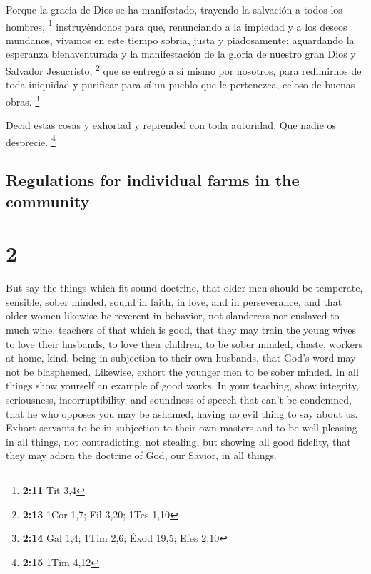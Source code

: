 \begin{paracol}{2}
 Porque la gracia de Dios se ha manifestado, trayendo la
salvación a todos los hombres, \footnote{\textbf{2:11} Tit 3,4}
 instruyéndonos para que, renunciando a la impiedad y a
los deseos mundanos, vivamos en este tiempo sobria, justa y
piadosamente;  aguardando la esperanza bienaventurada y
la manifestación de la gloria de nuestro gran Dios y Salvador
Jesucristo, \footnote{\textbf{2:13} 1Cor 1,7; Fil 3,20; 1Tes 1,10}
 que se entregó a sí mismo por nosotros, para redimirnos
de toda iniquidad y purificar para sí un pueblo que le pertenezca,
celoso de buenas obras. \footnote{\textbf{2:14} Gal 1,4; 1Tim 2,6; Éxod
  19,5; Efes 2,10}

 Decid estas cosas y exhortad y reprended con toda
autoridad. Que nadie os desprecie. \footnote{\textbf{2:15} 1Tim 4,12}

\switchcolumn
\begin{otherlanguage}{english}

\hypertarget{regulations-for-individual-farms-in-the-community}{%
\subsection{Regulations for individual farms in the
community}\label{regulations-for-individual-farms-in-the-community}}

\hypertarget{section-3}{%
\section{2}\label{section-3}}

 But say the things which fit sound doctrine,
 that older men should be temperate, sensible, sober
minded, sound in faith, in love, and in perseverance,  and
that older women likewise be reverent in behavior, not slanderers nor
enslaved to much wine, teachers of that which is good, 
that they may train the young wives to love their husbands, to love
their children,  to be sober minded, chaste, workers at
home, kind, being in subjection to their own husbands, that God's word
may not be blasphemed.  Likewise, exhort the younger men
to be sober minded.  In all things show yourself an
example of good works. In your teaching, show integrity, seriousness,
incorruptibility,  and soundness of speech that can't be
condemned, that he who opposes you may be ashamed, having no evil thing
to say about us.  Exhort servants to be in subjection to
their own masters and to be well-pleasing in all things, not
contradicting,  not stealing, but showing all good
fidelity, that they may adorn the doctrine of God, our Savior, in all
things.


\end{otherlanguage}
\end{paracol}
